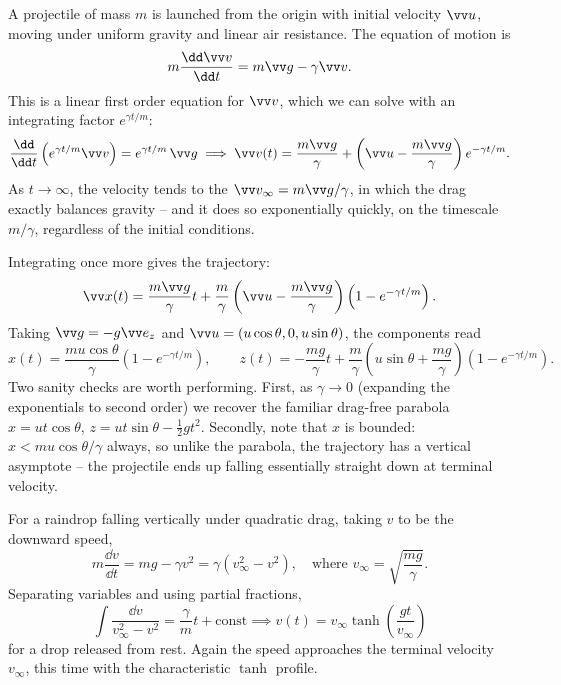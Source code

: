 \begin{example}
	A projectile of mass $m$ is launched from the origin with initial velocity $\vv u$, moving under uniform gravity and linear air resistance. The equation of motion is
	$$
	m \frac{\dd \vv v}{\dd t} = m \vv g - \gamma \vv v.
	$$
	This is a linear first order equation for $\vv v$, which we can solve with an integrating factor $e^{\gamma t/m}$:
	$$
	\frac{\dd}{\dd t}\left(e^{\gamma t/m} \vv v\right) = e^{\gamma t/m}\, \vv g \implies \vv v(t) = \frac{m \vv g}{\gamma} + \left(\vv u - \frac{m \vv g}{\gamma}\right)e^{-\gamma t/m}.
	$$
	As $t \to \infty$, the velocity tends to the  $\vv v_\infty = m\vv g/\gamma$, in which the drag exactly balances gravity -- and it does so exponentially quickly, on the timescale $m/\gamma$, regardless of the initial conditions.

	Integrating once more gives the trajectory:
	$$
	\vv x(t) = \frac{m \vv g}{\gamma} t + \frac{m}{\gamma}\left(\vv u - \frac{m \vv g}{\gamma}\right)\left(1 - e^{-\gamma t/m}\right).
	$$
	Taking $\vv g = -g \vv e_z$ and $\vv u = (u \cos \theta, 0, u \sin \theta)$, the components read
	$$
	x(t) = \frac{mu\cos\theta}{\gamma}\left(1 - e^{-\gamma t/m}\right), \qquad z(t) = -\frac{mg}{\gamma}t + \frac{m}{\gamma}\left(u \sin\theta + \frac{mg}{\gamma}\right)\left(1 - e^{-\gamma t/m}\right).
	$$
	Two sanity checks are worth performing. First, as $\gamma \to 0$ (expanding the exponentials to second order) we recover the familiar drag-free parabola $x = ut\cos\theta$, $z = ut \sin \theta - \frac{1}{2}gt^2$. Secondly, note that $x$ is bounded: $x < mu\cos\theta/\gamma$ always, so unlike the parabola, the trajectory has a vertical asymptote -- the projectile ends up falling essentially straight down at terminal velocity.
\end{example}

\begin{example}
	For a raindrop falling vertically under quadratic drag, taking $v$ to be the downward speed,
	$$
	m \frac{\dd v}{\dd t} = mg - \gamma v^2 = \gamma\left(v_\infty^2 - v^2\right), \quad \text{where } v_\infty = \sqrt{\frac{mg}{\gamma}}.
	$$
	Separating variables and using partial fractions,
	$$
	\int \frac{\dd v}{v_\infty^2 - v^2} = \frac{\gamma}{m} t + \text{const} \implies v(t) = v_\infty \tanh\left(\frac{g t}{v_\infty}\right)
	$$
	for a drop released from rest. Again the speed approaches the terminal velocity $v_\infty$, this time with the characteristic $\tanh$ profile.
\end{example}


